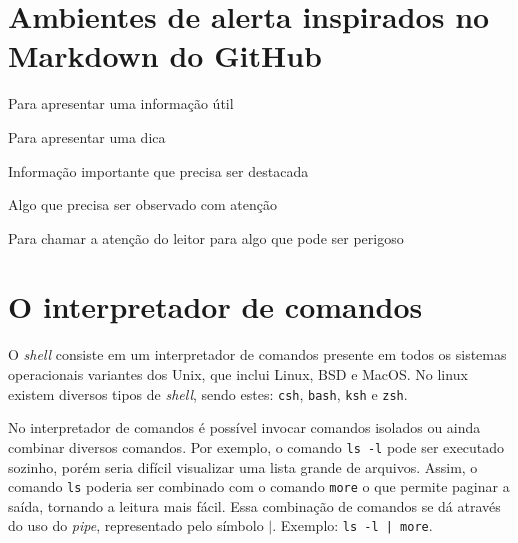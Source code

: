\documentclass[11pt]{ifscarticle}
\begin{document}

 


\section{Ambientes de alerta inspirados no Markdown do GitHub}

\begin{note}[Nota][\faInfoCircle][notecolor]
	Para apresentar uma informação útil
\end{note}

\begin{tip}
	Para apresentar uma dica
\end{tip}

\begin{important}
	Informação importante que precisa ser destacada
\end{important}

\begin{warning}
	Algo que precisa ser observado com atenção
\end{warning}

\begin{caution}
	Para chamar a atenção do leitor para algo que pode ser perigoso
\end{caution}


\section{O interpretador de comandos}

O \textit{shell} consiste em um interpretador de comandos presente em todos os sistemas operacionais variantes dos Unix, que inclui Linux, BSD e MacOS. No linux existem diversos tipos de \textit{shell}, sendo estes: \texttt{csh}, \texttt{bash}, \texttt{ksh} e \texttt{zsh}. 

No interpretador de comandos é possível invocar comandos isolados ou ainda combinar diversos comandos. Por exemplo, o comando \texttt{ls -l} pode ser executado sozinho, porém seria difícil visualizar uma lista grande de arquivos. Assim, o comando \texttt{ls} poderia ser combinado com o comando \texttt{more} o que permite paginar a saída, tornando a leitura mais fácil. Essa combinação de comandos se dá através do uso do \textit{pipe}, representado pelo símbolo $|$. Exemplo: \texttt{ls -l | more}.
\end{document}
